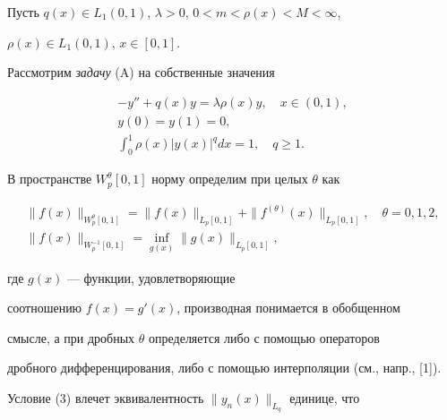 

\maketitle 


\label{begin} 


 


 


 


Пусть $q(x)\in L_1(0,1)$, $\lambda>0$, $0<m<\rho(x)< M<\infty$, 


$\rho(x)\in L_1(0,1)$, $x\in[0,1]$. 


Рассмотрим {\it задачу} (A) на собственные значения 


\begin{gather} 


-y''+q(x)y=\lambda\rho(x)y,\quad x\in(0,1),\\ 


y(0)=y(1)=0,\\ 


\int^1_0\rho(x)|y(x)|^q dx=1,\quad q\ge1. 


\end{gather} 


 


В пространстве $W^\theta_p[0,1]$ норму определим при целых $\theta$ как 


\begin{gather*} 


\|f(x)\|_{W^\theta_p[0,1]}=\|f(x)\|_{L_p[0,1]}+ 


\|f^{(\theta)}(x)\|_{L_p[0,1]},\quad \theta=0,1,2,\\ 


\|f(x)\|_{W^{-1}_p[0,1]}=\inf_{g(x)}\|g(x)\|_{L_p[0,1]}, 


\end{gather*} 


где $g(x)$ --- функции, удовлетворяющие 


соотношению $f(x)=g'(x)$, производная понимается в обобщенном 


смысле, а при дробных $\theta$ определяется либо с помощью операторов


дробного дифференцирования, либо с помощью интерполяции (см., напр., [1]). 


 


Условие (3) влечет эквивалентность $\|y_n(x)\|_{L_q}$ единице, что 


